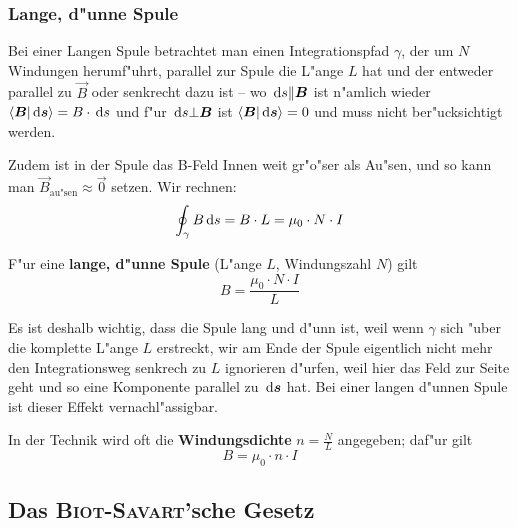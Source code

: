\subsubsection{Lange, d"unne Spule}
\label{kap_lange-dunne-spule}



Bei einer {Langen Spule} betrachtet man einen Integrationspfad
$\gamma$, der um $N$ Windungen herumf"uhrt, parallel zur Spule die
L"ange $L$ hat und der entweder
parallel zu $\vec B$ oder senkrecht dazu ist -- wo $\, \mathrm{d} s \| \boldsymbol{B}$
ist n"amlich wieder $\langle \boldsymbol{B} |\, \mathrm{d} \boldsymbol{s}  \rangle  = B \cdot
\, \mathrm{d} s$ und f"ur $\, \mathrm{d} s \bot \boldsymbol{B}$ ist $\langle \boldsymbol{B} | \, \mathrm{d}
\boldsymbol{s}  \rangle = 0$ und muss nicht ber"ucksichtigt werden.

Zudem ist in der Spule das B-Feld Innen weit gr"o"ser als Au"sen, und so
kann man $\vec B_\text{au"sen} \approx \vec 0$ setzen. Wir rechnen:
\begin{equation*}
   \label{eq:308}
   \oint_\gamma B \, \mathrm{d} s = B \cdot L = \mu_0 \cdot N \cdot I
\end{equation*}

\begin{Wichtig}
   F"ur eine \textbf{lange, d"unne Spule} (L"ange $L$, Windungszahl $N$) gilt
   \begin{equation}
      \label{eqn_B-spule}
      B = \frac{ \mu_0 \cdot N \cdot I}{L}
   \end{equation}
\end{Wichtig}
Es ist deshalb wichtig, dass die Spule lang und d"unn ist, weil wenn
$\gamma$ sich "uber die komplette L"ange $L$ erstreckt, wir am Ende der
Spule eigentlich nicht mehr den Integrationsweg senkrech zu $L$
ignorieren d"urfen, weil hier das Feld zur Seite geht und so eine
Komponente parallel zu $\, \mathrm{d} \boldsymbol{s}$ hat. Bei einer langen d"unnen
Spule ist dieser Effekt vernachl"assigbar.

In der Technik wird oft die \textbf{Windungsdichte} $n = \frac{N}{L}$
angegeben; daf"ur gilt
\begin{equation*}
   B  = \mu_0 \cdot n \cdot I
\end{equation*}







\subsection{Das \textsc{Biot-Savart}'sche Gesetz}
\label{kap_bio-savartsche-gesetz}

